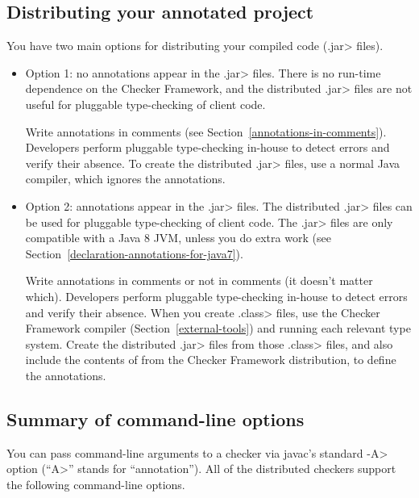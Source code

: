 \subsection{Distributing your annotated project\label{distributing}}

You have two main options for distributing your compiled code (\<.jar>
files).

\begin{itemize}
\item
  Option 1: no annotations appear in the \<.jar> files.  There is no
  run-time dependence on the Checker Framework, and the distributed \<.jar>
  files are not useful for pluggable type-checking of client code.

  Write annotations in comments (see
  Section~\ref{annotations-in-comments}).
  Developers perform pluggable type-checking in-house to detect errors and
  verify their absence.
  To create the distributed \<.jar> files, use a normal Java compiler,
  which ignores the annotations.
\item
  Option 2: annotations appear in the \<.jar> files.  The distributed
  \<.jar> files can be used for pluggable type-checking of client code.
  The \<.jar> files are only compatible with a Java 8 JVM, unless you
  do extra work (see Section~\ref{declaration-annotations-for-java7}).

  Write annotations in comments or not in comments (it doesn't matter which).
  Developers perform pluggable type-checking in-house to detect errors and
  verify their absence.
  When you create \<.class> files, use the Checker Framework compiler
  (Section~\ref{external-tools}) and running each relevant type system.
  Create the distributed \<.jar> files from those \<.class> files, and also
  include the contents of
   from the Checker
  Framework distribution, to define the annotations.

\end{itemize}


\subsection{Summary of command-line options\label{checker-options}}

You can pass command-line arguments to a checker via javac's standard \<-A>
option (``\<A>'' stands for ``annotation'').  All of the distributed
checkers support the following command-line options.

